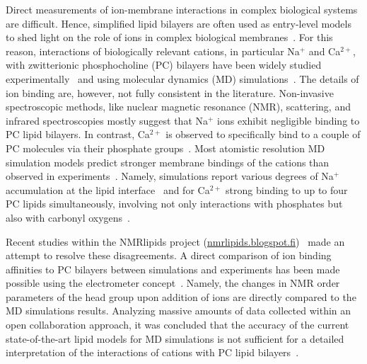 \documentclass[journal=jpcbfk,manuscript=article]{achemso}
\begin{document}
Direct measurements of ion-membrane interactions in complex biological systems are difficult. 
Hence, simplified lipid bilayers are often used as entry-level models to shed light on the role of ions in complex biological membranes~\cite{scherer87,seelig90,cevc90}. 
For this reason, interactions of biologically relevant cations, in particular Na$^+$ and Ca$^{2+}$, with zwitterionic phosphocholine (PC) bilayers have been widely studied experimentally~\cite{akutsu81, altenbach84, seelig90, cevc90, tocanne90, binder02, pabst07, uhrikova08} and using molecular dynamics (MD)
simulations~\cite{bockmann03, bockmann04, sachs04, berkowitz06, cordomi08,cordomi09,vacha09a,valley11,Berkowitz12,knecht13, melcrova16, javanainen17}.
The details of ion binding are, however, not fully consistent in the literature. Non-invasive spectroscopic methods, like nuclear magnetic resonance (NMR), scattering, and infrared spectroscopies mostly suggest that Na$^+$ ions exhibit negligible binding to PC lipid bilayers. In contrast, Ca$^{2+}$ is observed to specifically bind to a couple of PC molecules via their phosphate groups~\cite{hauser76, hauser78, herbette84, akutsu81, altenbach84, binder02, pabst07, uhrikova08}. Most atomistic resolution MD simulation models predict stronger membrane bindings of the cations than observed in experiments~\cite{catte16}. Namely, simulations report various degrees of Na$^+$ accumulation at the lipid interface~\cite{bockmann03} and for Ca$^{2+}$ strong binding to up to four PC lipids simultaneously, involving not only interactions with phosphates but also with carbonyl oxygens~\cite{bockmann04, melcrova16, javanainen17}.

Recent studies within the NMRlipids project (\url{nmrlipids.blogspot.fi})~\cite{catte16} made an attempt to resolve these disagreements. A direct comparison of ion binding affinities to PC bilayers between simulations and experiments has been made possible using the electrometer concept~\cite{seelig87}. Namely, the changes in NMR order parameters of the head group upon addition of ions are directly compared to the MD simulations results. 
Analyzing massive amounts of data collected within an open collaboration approach, 
it was concluded that the accuracy of the current state-of-the-art lipid models for MD simulations is not sufficient for a detailed interpretation of the interactions of cations with PC lipid bilayers~\cite{catte16}.
\end{document}
